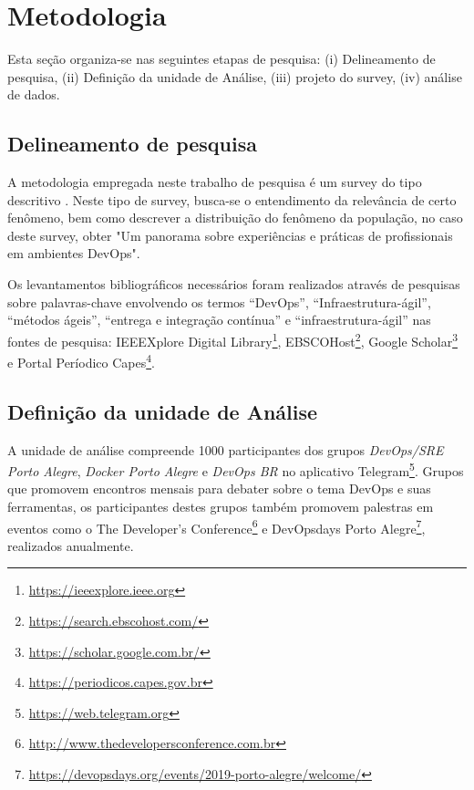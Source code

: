 \documentclass[twoside,english,brazilian]{UNISINOSartigo}
\begin{document}
\section{Metodologia}
Esta seção organiza-se nas seguintes etapas de pesquisa: (i) Delineamento de pesquisa, (ii) Definição da unidade de Análise, (iii) projeto do survey, (iv) análise de dados.

\subsection{Delineamento de pesquisa}
A metodologia empregada neste trabalho de pesquisa é um survey do tipo descritivo \cite{Miguel}. Neste tipo de survey, busca-se o entendimento da relevância de certo fenômeno, bem como descrever a distribuição do fenômeno da população, no caso deste survey, obter "Um panorama sobre experiências e práticas de profissionais em ambientes DevOps".

Os levantamentos bibliográficos necessários foram realizados através de pesquisas sobre palavras-chave envolvendo os termos ``DevOps'', ``Infraestrutura-ágil'', ``métodos ágeis'', ``entrega e integração contínua'' e ``infraestrutura-ágil'' nas fontes de pesquisa: IEEEXplore Digital Library\footnote{\url{https://ieeexplore.ieee.org}}, EBSCOHost\footnote{\url{https://search.ebscohost.com/}}, Google Scholar\footnote{\url{https://scholar.google.com.br/}} e Portal Períodico Capes\footnote{\url{https://periodicos.capes.gov.br}}.

\subsection{Definição da unidade de Análise}
A unidade de análise compreende 1000 participantes dos grupos \textit{DevOps/SRE Porto Alegre}, \textit{Docker Porto Alegre} e \textit{DevOps BR} no aplicativo Telegram\footnote{\url{https://web.telegram.org}}. Grupos que promovem encontros mensais para debater sobre o tema DevOps e suas ferramentas, os participantes destes grupos também promovem palestras em eventos como o The Developer's Conference\footnote{\url{http://www.thedevelopersconference.com.br}} e DevOpsdays Porto Alegre\footnote{\url{https://devopsdays.org/events/2019-porto-alegre/welcome/}}, realizados anualmente. 
\end{document}
